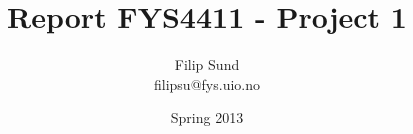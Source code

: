 \documentclass[a4paper,10pt]{article}
\title{Report FYS4411 - Project 1}
\author{Filip Sund \\ filipsu@fys.uio.no}
\date{Spring 2013}
\begin{document}
\maketitle{}


% 
%
\end{document}
